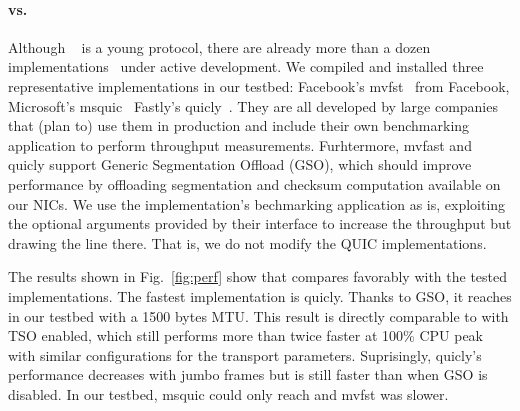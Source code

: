 \paragraph{\tcpls vs. \quic}
Although \quic~\cite{draft-ietf-quic-transport} is a young protocol, there are
already more than a dozen implementations~\cite{marx2020same,quicimplem,yang2020making} under active development. We compiled and installed three representative \quic implementations in our testbed: Facebook's mvfst~\cite{} from Facebook, Microsoft's msquic~\cite{} Fastly's quicly~\cite{}. They are all developed by
large companies that (plan to) use them in production and include their own
benchmarking application to perform throughput measurements. Furhtermore,
mvfast and quicly support Generic Segmentation Offload (GSO), which should improve performance by offloading \udp segmentation and checksum computation available on our NICs. We use the implementation's bechmarking application
as is, exploiting the optional arguments provided by their interface to increase the throughput but drawing the line there. That is, we do not modify the QUIC implementations.

The results shown in Fig.~\ref{fig:perf} show that \tcpls compares favorably
with the tested \quic implementations. The fastest \quic implementation is quicly. Thanks to GSO, it reaches  in our testbed with a 1500 bytes MTU. This result is directly comparable to \tcpls with TSO enabled,
which still performs more than twice faster at 100\% CPU peak with similar configurations for the transport parameters. Suprisingly, quicly's performance decreases with jumbo frames but is still faster than when GSO is disabled. In our testbed, msquic could only reach  and mvfst was slower.







